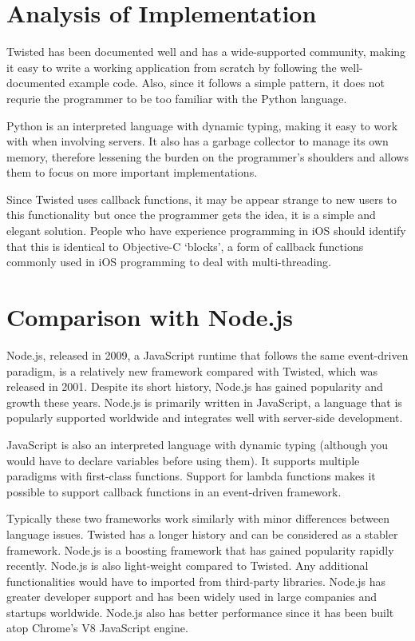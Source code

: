 \documentclass[letterpaper,twocolumn,10pt]{article}
\begin{document}
\section{Analysis of Implementation}

Twisted has been documented well and has a wide-supported community, making it easy to write a working application from scratch by following the well-documented example code. Also, since it follows a simple pattern, it does not requrie the programmer to be too familiar with the Python language.

Python is an interpreted language with dynamic typing, making it easy to work with when involving servers. It also has a garbage collector to manage its own memory, therefore lessening the burden on the programmer's shoulders and allows them to focus on more important implementations.

Since Twisted uses callback functions, it may be appear strange to new users to this functionality but once the programmer gets the idea, it is a simple and elegant solution. People who have experience programming in iOS should identify that this is identical to Objective-C `blocks', a form of callback functions commonly used in iOS programming to deal with multi-threading.

\section{Comparison with Node.js}

Node.js, released in 2009, a JavaScript runtime that follows the same event-driven paradigm, is a relatively new framework compared with Twisted, which was released in 2001. Despite its short history, Node.js has gained popularity and growth these years. Node.js is primarily written in JavaScript, a language that is popularly supported worldwide and integrates well with server-side development.

JavaScript is also an interpreted language with dynamic typing (although you would have to declare variables before using them). It supports multiple paradigms with first-class functions. Support for lambda functions makes it possible to support callback functions in an event-driven framework.

Typically these two frameworks work similarly with minor differences between language issues. Twisted has a longer history and can be considered as a stabler framework. Node.js is a boosting framework that has gained popularity rapidly recently. Node.js is also light-weight compared to Twisted. Any additional functionalities would have to imported from third-party libraries. Node.js has greater developer support and has been widely used in large companies and startups worldwide. Node.js also has better performance since it has been built atop Chrome's V8 JavaScript engine. 
\end{document}
